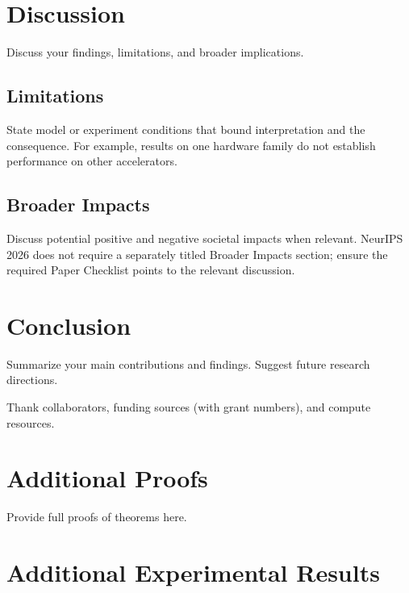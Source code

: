\documentclass{article}
\begin{document}
\section{Discussion}
\label{sec:discussion}

Discuss your findings, limitations, and broader implications.

\subsection{Limitations}
State model or experiment conditions that bound interpretation and the consequence. For example, results on one hardware family do not establish performance on other accelerators.

\subsection{Broader Impacts}
Discuss potential positive and negative societal impacts when relevant. NeurIPS 2026
does not require a separately titled Broader Impacts section; ensure the required
Paper Checklist points to the relevant discussion.

\section{Conclusion}
\label{sec:conclusion}

Summarize your main contributions and findings. Suggest future research directions.

\begin{ack}
Thank collaborators, funding sources (with grant numbers), and compute resources.
\end{ack}


\appendix

\section{Additional Proofs}
\label{app:proofs}

Provide full proofs of theorems here.

\section{Additional Experimental Results}
\label{app:experiments}
\end{document}
